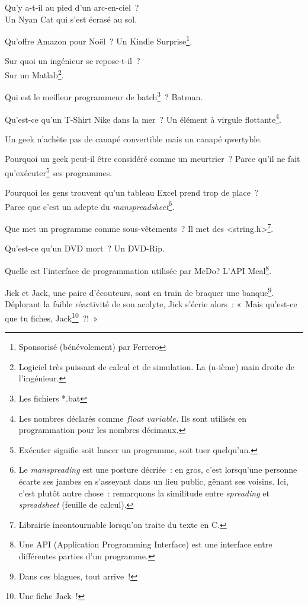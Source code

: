 \documentclass[10pt,a5paper,fullpage]{book}
\begin{document}
\begin{enumerate}
{		\item Qu’y a-t-il au pied d’un arc-en-ciel~? \\Un Nyan Cat qui s’est écrasé au sol.
		\item Qu'offre Amazon pour Noël~? Un Kindle Surprise\footnote{Sponsorisé (bénévolement) par Ferrero\textregistered}.
		\item Sur quoi un ingénieur se repose-t-il~? \\Sur un Matlab\footnote{Logiciel très puissant de calcul et de simulation. La (n-ième) main droite de l’ingénieur.}.
		\item Qui est le meilleur programmeur de batch\footnote{Les fichiers *.bat}~? Batman.
		\item Qu’est-ce qu’un T-Shirt Nike dans la mer~? Un élément à virgule flottante\footnote{Les nombres déclarés comme $\textit{float variable}$. Ils sont utilisés en programmation pour les nombres décimaux.}.
		\item Un geek n’achète pas de canapé convertible mais un canapé qwertyble.
		\item Pourquoi un geek peut-il être considéré comme un meurtrier~? Parce qu’il ne fait qu’exécuter\footnote{Exécuter signifie soit lancer un programme, soit tuer quelqu'un.} ses programmes.
		\item Pourquoi les gens trouvent qu'un tableau Excel prend trop de place~? \\Parce que c'est un adepte du \textit{manspreadsheet}\footnote{Le \textit{manspreading} est une posture décriée~: en gros, c'est lorsqu'une personne écarte ses jambes en s'asseyant dans un lieu public, gênant ses voisins. Ici, c'est plutôt autre chose~: remarquons la similitude entre \textit{spreading} et \textit{spreadsheet} (feuille de calcul).}. 
		\item Que met un programme comme sous-vêtements~? Il met des <string.h>\footnote{Librairie incontournable lorsqu'on traite du texte en C.}.
		\item Qu’est-ce qu’un DVD mort~? Un DVD-Rip.
		\item Quelle est l'interface de programmation utilisée par McDo? L'API Meal\footnote{Une API (Application Programming Interface) est une interface entre différentes parties d'un programme.}.
		\item Jick et Jack, une paire d’écouteurs, sont en train de braquer une banque\footnote{Dans ces blagues, tout arrive~!}. Déplorant la faible réactivité de son acolyte, Jick s’écrie alors~: «~Mais qu’est-ce que tu fiches, Jack\footnote{Une fiche Jack~!}~?!~»
}
\end{enumerate}
\end{document}
